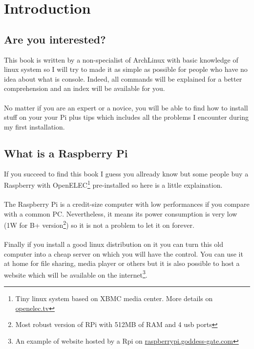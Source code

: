 \chapter{Introduction}
	\section{Are you interested?}
This book is written by a non-specialist of ArchLinux with basic knowledge of 
linux system so I will try to made it as simple as possible for people 
who have no idea about what is console. Indeed, all commands will be 
explained for a better comprehension and an index will be available for you.
\\\\
No matter if you are an expert or a novice, you will be able to find 
how to install stuff on your your Pi plus tips which includes all the problems 
I encounter during my first installation.

	\section{What is a Raspberry Pi}
If you succeed to find this book I guess you allready know but some people 
buy a Raspberry with OpenELEC\footnote{Tiny linux system based on XBMC media center. 
More details on \href{http://openelec.tv}{openelec.tv}} pre-installed so here 
is a little explaination.
\\\\
The Raspberry Pi is a credit-size computer with low performances if you
compare with a common PC. Nevertheless, it means its power consumption is
very low (1W for B+ version\footnote{Most robust version of RPi with 512MB 
of RAM and 4 usb ports}) so it is not a problem to let it on forever. 
\\\\
Finally if you install a good linux distribution on it you can turn this old computer
into a cheap server on which you will have the control. You can use it 
at home for file sharing, media player or others but it is also possible
to host a website which will be available on the internet\footnote{An example
of website hosted by a Rpi on \href{http://raspberrypi.goddess-gate.com}
{raspberrypi.goddess-gate.com}}.

